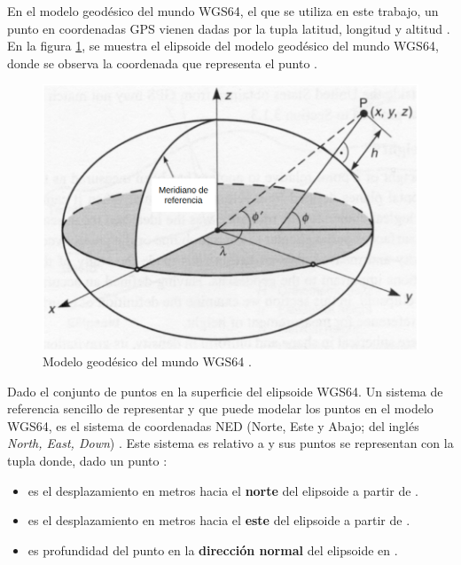En el modelo geodésico del mundo WGS64, el que se utiliza en este trabajo, un punto en coordenadas GPS vienen dadas por la tupla latitud, longitud y altitud  \cite{2002convertGPS}. En la figura \ref{fig:WGS64}, se muestra el elipsoide del modelo geodésico del mundo WGS64, donde se observa la coordenada  que representa el punto .

\begin{figure}[H]
    \centering
    \includegraphics[scale=0.3]{partes/ImgJoao/WGS64.png}
    \caption[Modelo geodésico del mundo WGS64.]{Modelo geodésico del mundo WGS64 \footnotemark.} 
    \label{fig:WGS64}
\end{figure}

Dado  el conjunto de puntos en la superficie del elipsoide WGS64. Un sistema de referencia sencillo de representar y que puede modelar los puntos  en el modelo WGS64, es el sistema de coordenadas NED (Norte, Este y Abajo; del inglés \textit{North, East, Down}) \cite{cai2011coordinate}. Este sistema es relativo a  y sus puntos se representan con la tupla  donde, dado un punto :

\begin{itemize}
    \item {} es el desplazamiento en metros hacia el \textbf{norte} del elipsoide a partir de .
    \item {} es el desplazamiento en metros hacia el \textbf{este} del elipsoide a partir de .
    \item {} es profundidad del punto en la \textbf{dirección normal} del elipsoide en .
\end{itemize}

